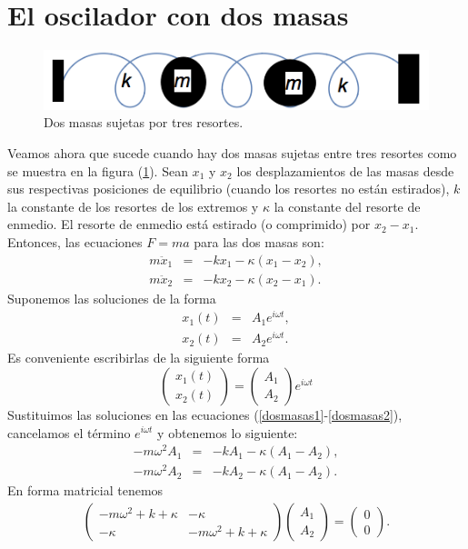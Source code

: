 \documentclass[letterpaper,12pt,oneside]{book}
\begin{document}
\section{El oscilador con dos masas} 
\begin{figure}
\centering
\includegraphics[scale=0.8]{fig/dosmasas}
\caption{\label{dosmasas}  Dos masas sujetas por tres resortes.  }
\end{figure}
Veamos ahora que sucede cuando hay dos masas sujetas entre tres resortes como se muestra en la figura (\ref{dosmasas}). Sean $x_1$ y $x_2$ los desplazamientos de las masas desde sus respectivas posiciones de equilibrio (cuando los resortes no est\'an estirados), $k$ la constante de los resortes de los extremos y $\kappa$ la constante del resorte de enmedio. El resorte de enmedio est\'a estirado (o comprimido) por $x_2-x_1$. Entonces, las ecuaciones $F=ma$ para las dos masas son:
%
\begin{eqnarray}
m\ddot x_1 &=& -kx_1-\kappa(x_1-x_2),\label{dosmasas1}\\
m\ddot x_2 &=& -kx_2-\kappa(x_2-x_1).\label{dosmasas2}
\end{eqnarray}
%
Suponemos las soluciones de la forma 
%
\begin{eqnarray}
x_1(t)&=&A_1e^{i\omega t},\\
x_2(t)&=&A_2e^{i\omega t}.
\end{eqnarray}
%
Es conveniente escribirlas de la siguiente forma
%
\[\begin{pmatrix}
x_1(t)\\
x_2(t)
\end{pmatrix} = \begin{pmatrix}
A_1\\
A_2
\end{pmatrix} e^{i\omega t}\]
%
Sustituimos las soluciones en las ecuaciones (\ref{dosmasas1}-\ref{dosmasas2}), cancelamos el t\'ermino $e^{i\omega t}$ y obtenemos lo siguiente:
%
\begin{eqnarray}
-m\omega ^2A_1 &=& -kA_1 - \kappa(A_1-A_2),\\
-m\omega ^2A_2 &=& -kA_2 - \kappa(A_1-A_2).
\end{eqnarray}
%
En forma matricial tenemos
%
\begin{eqnarray}
\begin{pmatrix}
-m\omega ^2 + k + \kappa & -\kappa\\
-\kappa & -m\omega ^2 + k + \kappa
\end{pmatrix} \begin{pmatrix}
A_1\\
A_2
\end{pmatrix} = \begin{pmatrix}
0\\
0
\end{pmatrix}.\label{matricial}
\end{eqnarray}
\end{document}
